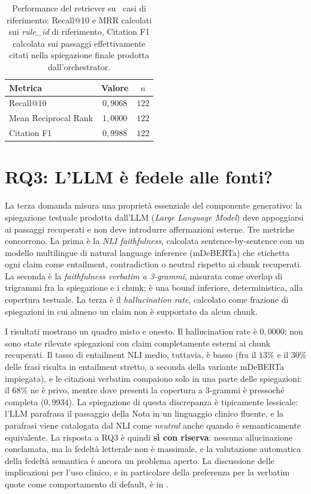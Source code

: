 \begin{table}[t]
  \centering
  \caption{Performance del retriever su \goldn\ casi di riferimento: Recall@10 e MRR calcolati sui \emph{rule\_id} di riferimento, Citation F1 calcolata sui passaggi effettivamente citati nella spiegazione finale prodotta dall'orchestrator.}
  \label{tab:retrieval}
  \small
  \begin{tabular}{lcc}
    \toprule
    Metrica & Valore & $n$ \\
    \midrule
    Recall@10           & $0{,}9068$ & $122$ \\
    Mean Reciprocal Rank& $1{,}0000$ & $122$ \\
    Citation F1         & $0{,}9988$ & $122$ \\
    \bottomrule
  \end{tabular}
\end{table}

\section{RQ3: L'LLM è fedele alle fonti?}
\label{sec:rq3}

La terza domanda misura una proprietà essenziale del componente generativo: la spiegazione testuale prodotta dall'LLM (\emph{Large Language Model}) deve appoggiarsi ai passaggi recuperati e non deve introdurre affermazioni esterne. Tre metriche concorrono. La prima è la \emph{NLI faithfulness}, calcolata sentence-by-sentence con un modello multilingue di natural language inference (mDeBERTa) che etichetta ogni claim come entailment, contradiction o neutral rispetto ai chunk recuperati. La seconda è la \emph{faithfulness verbatim a 3-grammi}, misurata come overlap di trigrammi fra la spiegazione e i chunk; è una bound inferiore, deterministica, alla copertura testuale. La terza è il \emph{hallucination rate}, calcolato come frazione di spiegazioni in cui almeno un claim non è supportato da alcun chunk.

I risultati mostrano un quadro misto e onesto. Il hallucination rate è $0{,}0000$: non sono state rilevate spiegazioni con claim completamente esterni ai chunk recuperati. Il tasso di entailment NLI medio, tuttavia, è basso (fra il $13\%$ e il $30\%$ delle frasi risulta in entailment stretto, a seconda della variante mDeBERTa impiegata), e le citazioni verbatim compaiono solo in una parte delle spiegazioni: il $68\%$ ne è privo, mentre dove presenti la copertura a 3-grammi è pressoché completa ($0{,}9934$). La spiegazione di questa discrepanza è tipicamente lessicale: l'LLM parafrasa il passaggio della Nota in un linguaggio clinico fluente, e la parafrasi viene catalogata dal NLI come \emph{neutral} anche quando è semanticamente equivalente. La risposta a RQ3 è quindi \textbf{sì con riserva}: nessuna allucinazione conclamata, ma la fedeltà letterale non è massimale, e la valutazione automatica della fedeltà semantica è ancora un problema aperto. La discussione delle implicazioni per l'uso clinico, e in particolare della preferenza per la verbatim quote come comportamento di default, è in .

